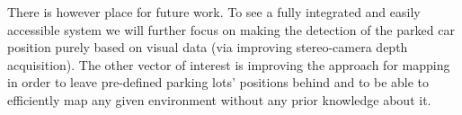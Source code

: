     There is however place for future work. To see a fully integrated and easily accessible system we will further focus on making the detection of the parked car position purely based on visual data (via improving stereo-camera depth acquisition). The other vector of interest is improving the approach for mapping in order to leave pre-defined parking lots' positions behind and to be able to efficiently map any given environment without any prior knowledge about it.

